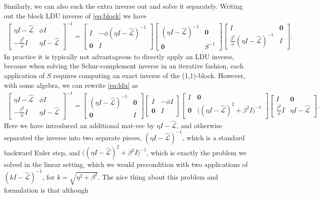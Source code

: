 \documentclass[a4paper,10pt]{article}
\begin{document}
Similarly, we can also suck the extra inverse out and solve it separately. Writing
out the block LDU inverse of \eqref{eq:block} we have
%
\begin{align}\label{eq:ldu}
\begin{bmatrix} \eta I - \widehat{\mathcal{L}} & \phi I\\
	-\frac{\beta^2}{\phi} I & \eta I - \widehat{\mathcal{L}}\end{bmatrix}^{-1}
= \begin{bmatrix} I & -\phi(\eta I - \widehat{\mathcal{L}})^{-1} \\ \mathbf{0} & I\end{bmatrix}
	\begin{bmatrix} (\eta I - \widehat{\mathcal{L}})^{-1} & \mathbf{0} \\ \mathbf{0} & S^{-1} \end{bmatrix}
	\begin{bmatrix} I & \mathbf{0} \\ \tfrac{\beta^2}{\phi}(\eta I - \widehat{\mathcal{L}})^{-1} & I
	\end{bmatrix}.
\end{align}
%
In practice it is typically not advantageous to directly apply an LDU inverse,
because when solving the Schur-complement inverse in an iterative fashion, each
application of $S$ requires computing an exact inverse of the (1,1)-block. However,
with some algebra, we can rewrite \eqref{eq:ldu} as
%
\begin{align}\label{eq:ldu2}
\begin{bmatrix} \eta I - \widehat{\mathcal{L}} & \phi I\\
	-\frac{\beta^2}{\phi} I & \eta I - \widehat{\mathcal{L}}\end{bmatrix}^{-1}
= \begin{bmatrix} (\eta I - \widehat{\mathcal{L}})^{-1} & \mathbf{0} \\ \mathbf{0} & I\end{bmatrix}
\begin{bmatrix} I & -\phi I \\ \mathbf{0} & I\end{bmatrix}
	\begin{bmatrix} I & \mathbf{0} \\ \mathbf{0} &
		\Big((\eta I - \widehat{\mathcal{L}})^2 + \beta^2I\Big)^{-1} \end{bmatrix}
	\begin{bmatrix} I & \mathbf{0} \\ \tfrac{\beta^2}{\phi} I & \eta I - \widehat{\mathcal{L}}
	\end{bmatrix}.
\end{align}
%
Here we have introduced an additional mat-vec by $\eta I - \widehat{\mathcal{L}}$,
and otherwise separated the inverse into two separate pieces, $(\eta I - \widehat{\mathcal{L}})^{-1}$,
which is a standard backward Euler step, and
$\Big((\eta I - \widehat{\mathcal{L}})^2 + \beta^2I\Big)^{-1}$, which is exactly the
problem we solved in the linear setting, which we would precondition with two
applications of $(k I - \widehat{\mathcal{L}})^{-1}$, for $k=\sqrt{\eta^2+\beta^2}$.
The nice thing about this problem and formulation is that although 
\end{document}
